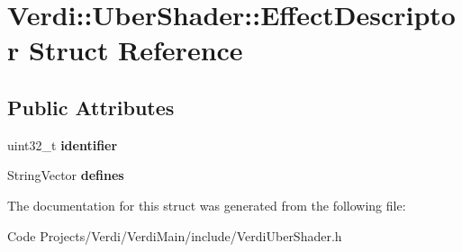 \hypertarget{struct_verdi_1_1_uber_shader_1_1_effect_descriptor}{\section{\-Verdi\-:\-:\-Uber\-Shader\-:\-:\-Effect\-Descriptor \-Struct \-Reference}
\label{struct_verdi_1_1_uber_shader_1_1_effect_descriptor}
}
\subsection*{\-Public \-Attributes}
\begin{DoxyCompactItemize}
\item 
\hypertarget{struct_verdi_1_1_uber_shader_1_1_effect_descriptor_af632cac19c1b5f3433ff298b9a0efbb0}{uint32\-\_\-t {\bfseries identifier}}\label{struct_verdi_1_1_uber_shader_1_1_effect_descriptor_af632cac19c1b5f3433ff298b9a0efbb0}

\item 
\hypertarget{struct_verdi_1_1_uber_shader_1_1_effect_descriptor_a38bcb48669fb6046f64ccf3597ed6e72}{\-String\-Vector {\bfseries defines}}\label{struct_verdi_1_1_uber_shader_1_1_effect_descriptor_a38bcb48669fb6046f64ccf3597ed6e72}

\end{DoxyCompactItemize}


\-The documentation for this struct was generated from the following file\-:\begin{DoxyCompactItemize}
\item 
\-Code Projects/\-Verdi/\-Verdi\-Main/include/\-Verdi\-Uber\-Shader.\-h\end{DoxyCompactItemize}
